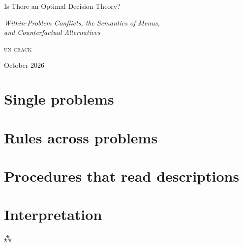 \documentclass[11pt,a4paper,oneside]{scrartcl}
\newcommand{\theauthor}{Un crack}
\theoremstyle{dtplain}
\theoremstyle{dtdef}
\begin{document}
\thispagestyle{plain.scrheadings}
\begin{center}
  \vspace*{.2\baselineskip}
  {\LARGE Is There an Optimal Decision Theory?\par}
  \vspace{.7\baselineskip}
  {\large\itshape Within-Problem Conflicts, the Semantics of Menus,\\ and Counterfactual Alternatives\par}
  \vspace{1.4\baselineskip}
  {\scshape \MakeLowercase{\theauthor}\par}
  \vspace{.3\baselineskip}
  {\small October 2026\par}
  \vspace{1.6\baselineskip}
\end{center}



\vspace{.8\baselineskip}
{\small\setcounter{tocdepth}{1}\renewcommand{\contentsname}{\normalsize\scshape contents}\tableofcontents}



\part{Single problems}\label{part:single}






\part{Rules across problems}\label{part:across}








\part{Procedures that read descriptions}\label{part:programs}







\part{Interpretation}\label{part:interpretation}



\appendix


\begin{center}
  \vspace{1.2\baselineskip}
  {\large ⁂}
\end{center}

\printbibliography[heading=bibintoc,title={References}]
\end{document}
